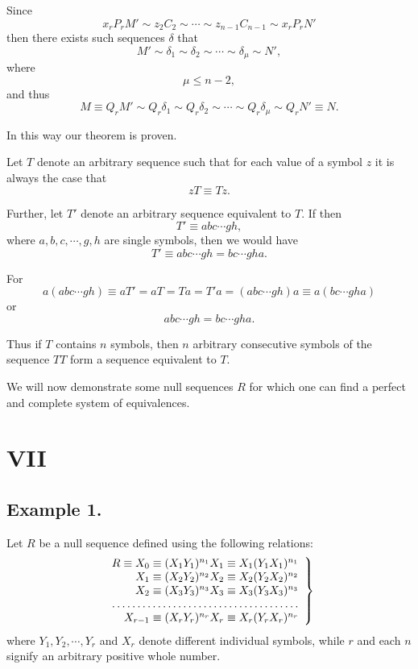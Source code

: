Since
$$x_rP_rM' \sim z_2C_2 \sim \cdots \sim z_{n-1}C_{n-1}
\sim x_rP_rN'$$
then there exists such sequences $\delta$ that
$$M' \sim \delta_1 \sim \delta_2 \sim \cdots \sim \delta_\mu \sim
N',$$
where $$\mu \leq n-2,$$
and thus
$$M \equiv Q_rM' \sim Q_r\delta_1 \sim  Q_r\delta_2 \sim \cdots \sim  Q_r\delta_\mu \sim
 Q_rN' \equiv N.$$

In this way our theorem is proven.

\bigskip

Let $T$ denote an arbitrary sequence such that for each value of a
symbol $z$ it is always the case that
$$zT \equiv Tz.$$

Further, let $T'$ denote an arbitrary sequence equivalent to $T$.
If then 
$$T' \equiv abc \cdots gh,$$
where $a,b,c,\cdots,g,h$ are single symbols, then we would have
$$T' \equiv abc \cdots gh = bc \cdots gha.$$

For
$$a(abc \cdots gh) \equiv aT' = aT = Ta = T'a = (abc \cdots gh)a \equiv a(bc \cdots gha)$$
or
$$abc \cdots gh = bc \cdots gha.$$

Thus if $T$ contains $n$ symbols, then $n$ arbitrary consecutive
symbols of the sequence $TT$ form a sequence equivalent to $T$.

\bigskip

We will now demonstrate some null sequences $R$ for which one can find
a perfect and complete system of equivalences.

\section{VII}

\subsection{Example 1.}

Let $R$ be a null sequence defined using the following relations:
\begin{equation}
\left.\begin{array}{r*{2}{@{\;\equiv\;}c}}
R \equiv  X_0 &  (X_1Y_1)^{n_1}X_1 &  X_1(Y_1X_1)^{n_1}\\
   X_1 &  (X_2Y_2)^{n_2}X_2 &  X_2(Y_2X_2)^{n_2}\\
   X_2 &  (X_3Y_3)^{n_3}X_3 & X_3(Y_3X_3)^{n_3}\\
   \hdotsfor{3} \\
   X_{r-1} & (X_rY_r)^{n_r}X_r & X_r(Y_rX_r)^{n_r}\\
\end{array}\right\}
\label{eq:six}
\end{equation}
where $Y_1,Y_2,\cdots,Y_r$ and $X_r$ denote different individual
symbols,
while $r$ and each $n$ signify an arbitrary positive whole 
number.


